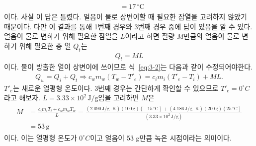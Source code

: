 \documentclass[floatfix,nofootinbib,superscriptaddress,fleqn]{revtex4-2}
\begin{document}
\begin{itemize}
\begin{align}
\begin{split}
    &= 17\,\mathrm{^\circ C}
  \end{split}
\end{align}
이다. 사실 이 답은 틀렸다. 얼음이 물로 상변이할 때 필요한 잠열을 고려하지 않았기 때문이다.
다만 이 결과를 통해 1번째 경우와 3번째 경우 중에 답이 있음을 알 수 있다. 
얼음이 물로 변하기 위해 필요한 잠열을 $L$이라고 하면 질량 $M$만큼의 얼음이 물로 변하기 위해
필요한 총 열 $Q_t$는
\begin{align}
Q_t = ML
\end{align}
이다. 물이 방출한 열이 상변이에 쓰이므로 식~\eqref{eq:3-2}는 다음과 같이 수정되어야한다.
\begin{align}
  Q_w = Q_i + Q_t
  \Longrightarrow c_{w}m_{w}(T_w-T'_e) = c_{i}m_{i}(T'_e-T_i)+ML.
\end{align}
$T'_e$는 새로운 열평형 온도이다.
3번째 경우는 간단하게 확인할 수 있으므로 $T'_e=0 ^\circ C$라고 해보자.
$L=3.33\times10^2\,\mathrm{J/g}$임을 고려하면 $M$은
\begin{align}
  \begin{split}
    M &= \frac{c_i m_i T_i+c_w m_w T_w}{L}
    = \frac{(2.090\,\mathrm{J/g\cdot K}) (100\,\mathrm{g}) (-15\,\mathrm{^\circ C})
    +(4.186\,\mathrm{J/g\cdot K}) (200\,\mathrm{g}) (25\,\mathrm{^\circ C})}
    {(3.33\times10^2\,\mathrm{J/g})}  \\
    &=53\,\mathrm{g}
  \end{split}
\end{align}
이다. 이는 열평형 온도가 $0 ^\circ C$이고 얼음이 53 g만큼 녹은 시점이라는 의미이다.


\end{itemize}
\end{document}
